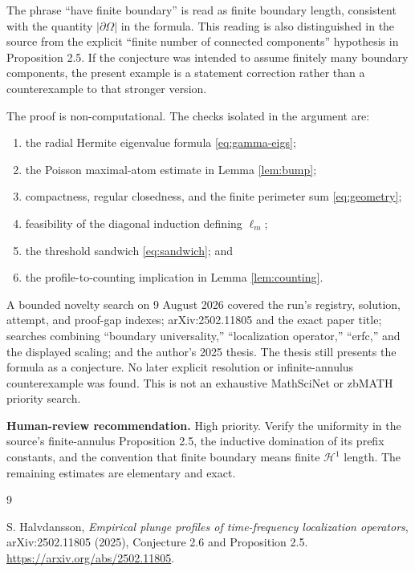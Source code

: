 \documentclass[11pt]{article}
\newcommand{\cH}{\mathcal H}
\begin{document}
The phrase ``have finite boundary'' is read as finite boundary length,
consistent with the quantity $|\partial\Omega|$ in the formula.  This reading
is also distinguished in the source from the explicit ``finite number of
connected components'' hypothesis in Proposition 2.5.  If the conjecture was
intended to assume finitely many boundary components, the present example is a
statement correction rather than a counterexample to that stronger version.

The proof is non-computational.  The checks isolated in the argument are:
\begin{enumerate}[leftmargin=2em]
\item the radial Hermite eigenvalue formula \eqref{eq:gamma-eigs};
\item the Poisson maximal-atom estimate in Lemma \ref{lem:bump};
\item compactness, regular closedness, and the finite perimeter sum
      \eqref{eq:geometry};
\item feasibility of the diagonal induction defining $\ell_m$;
\item the threshold sandwich \eqref{eq:sandwich}; and
\item the profile-to-counting implication in Lemma \ref{lem:counting}.
\end{enumerate}

A bounded novelty search on 9 August 2026 covered the run's registry,
solution, attempt, and proof-gap indexes; arXiv:2502.11805 and the exact paper
title; searches combining ``boundary universality,'' ``localization
operator,'' ``erfc,'' and the displayed scaling; and the author's 2025 thesis.
The thesis still presents the formula as a conjecture.  No later explicit
resolution or infinite-annulus counterexample was found.  This is not an
exhaustive MathSciNet or zbMATH priority search.

\textbf{Human-review recommendation.} High priority.  Verify the uniformity
in the source's finite-annulus Proposition 2.5, the inductive domination of
its prefix constants, and the convention that finite boundary means finite
$\cH^1$ length.  The remaining estimates are elementary and exact.

\sloppy
\begin{thebibliography}{9}
\raggedright
{}
S. Halvdansson,
\emph{Empirical plunge profiles of time-frequency localization operators},
arXiv:2502.11805 (2025), Conjecture 2.6 and Proposition 2.5.
\url{https://arxiv.org/abs/2502.11805}.
\end{thebibliography}
\end{document}
